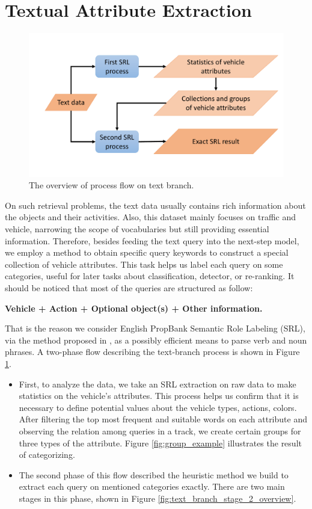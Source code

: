 \section{Textual Attribute Extraction}
\label{sec:text_extraction}
\begin{figure}[!htb]
    \centering
    \includegraphics[width=\textwidth]{images/methods/text_branch_overview.pdf}
    \caption{The overview of process flow on text branch.}
    \label{fig:text_branch_overview}
\end{figure}
On such retrieval problems, the text data usually contains rich information about the objects and their activities. Also, this dataset mainly focuses on traffic and vehicle, narrowing the scope of vocabularies but still providing essential information. Therefore, besides feeding the text query into the next-step model, we employ a method to obtain specific query keywords to construct a special collection of vehicle attributes. This task helps us label each query on some categories, useful for later tasks about classification, detector, or re-ranking.
It should be noticed that most of the queries are structured as follow:

\textbf{Vehicle + Action + Optional object(s) + Other information.}

That is the reason we consider English PropBank Semantic Role Labeling (SRL), via the method proposed in \cite{shi2019simple}, as a possibly efficient means to parse verb and noun phrases. A two-phase flow describing the text-branch process is shown in Figure \ref{fig:text_branch_overview}.
\begin{itemize}
    \item First, to analyze the data, we take an SRL extraction on raw data to make statistics on the vehicle's attributes. This process helps us confirm that it is necessary to define potential values about the vehicle types, actions, colors. After filtering the top most frequent and suitable words on each attribute and observing the relation among queries in a track, we create certain groups for three types of the attribute. Figure \ref{fig:group_example} illustrates the result of categorizing.
    \item The second phase of this flow described the heuristic method we build to extract each query on mentioned categories exactly. There are two main stages in this phase, shown in Figure \ref{fig:text_branch_stage_2_overview}.
\end{itemize}

